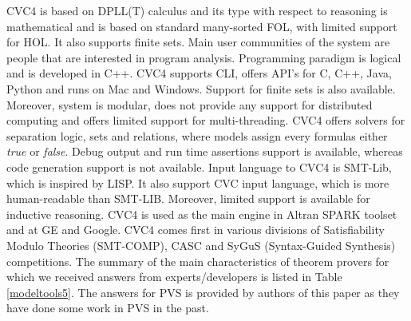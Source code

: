 CVC4 is based on DPLL(T) calculus  and its type with respect to reasoning is mathematical and is based on standard many-sorted FOL, 
with limited support for HOL. It also supports finite sets.
Main user communities of the system are people that are interested in program analysis.
Programming paradigm is logical and is developed in C++. CVC4 supports CLI, offers API's for C, C++, Java, Python and runs on Mac and Windows. 
Support for finite sets is also available. Moreover, system is modular, does not provide any support for distributed computing and offers limited support 
for multi-threading.  
CVC4 offers solvers for separation logic, sets and relations, where models assign every formulas either {\em true} or {\em false}.  
Debug output and run time assertions support is available, whereas code generation support is not available. 
Input language to CVC4 is SMT-Lib, which is inspired by LISP. It also support CVC input language, which is more human-readable than SMT-LIB.
Moreover, limited support is available for inductive reasoning. CVC4 is used as the main engine in Altran SPARK toolset and at GE and Google. CVC4 comes first in 
various divisions of Satisfiability Modulo Theories (SMT-COMP), CASC and SyGuS (Syntax-Guided Synthesis) competitions.
The summary of the main characteristics of theorem provers for which we received answers from experts/developers is listed in Table 
\ref{modeltools5}. The answers for PVS is provided by authors of this paper as they have done some work in PVS in the past.
